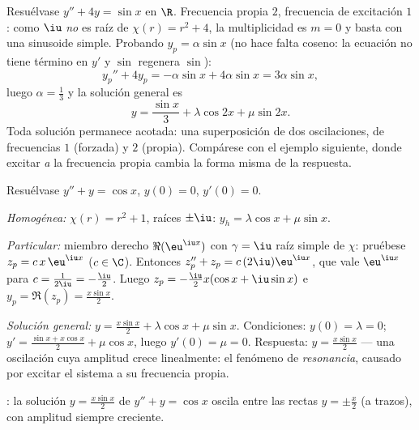 \begin{example}\label{ex:b1:diffeq:offresonance}
Resuélvase $y'' + 4y = \sin x$ en $\R$. Frecuencia propia $2$,
frecuencia de excitación $1$: como $\iu$ \emph{no} es raíz de
$\chi(r) = r^2 + 4$, la multiplicidad es $m = 0$ y basta con una
sinusoide simple. Probando $y_p = \alpha\sin x$ (no hace falta coseno:
la ecuación no tiene término en $y'$ y $\sin$ regenera $\sin$):
\[
y_p'' + 4y_p = -\alpha\sin x + 4\alpha\sin x = 3\alpha\sin x ,
\]
luego $\alpha = \frac13$ y la solución general es
\[
y = \frac{\sin x}3 + \lambda\cos 2x + \mu\sin 2x .
\]
Toda solución permanece acotada: una superposición de dos oscilaciones,
de frecuencias $1$ (forzada) y $2$ (propia). Compárese con el ejemplo
siguiente, donde excitar \emph{a} la frecuencia propia cambia la forma
misma de la respuesta.
\end{example}

\begin{example}\label{ex:b1:diffeq:oscillation}
Resuélvase $y'' + y = \cos x$, $y(0) = 0$, $y'(0) = 0$.

\emph{Homogénea:} $\chi(r) = r^2 + 1$, raíces $\pm\iu$:
$y_h = \lambda\cos x + \mu \sin x$.

\emph{Particular:} miembro derecho $\Re(\eu^{\iu x})$ con
$\gamma = \iu$ raíz simple de $\chi$: pruébese $z_p = c\, x\,
\eu^{\iu x}$ ($c \in \C$). Entonces $z_p'' + z_p = c\,(2\iu)\eu^{\iu x}$,
que vale $\eu^{\iu x}$ para $c = \frac{1}{2\iu} = -\frac\iu2$. Luego
$z_p = -\frac{\iu}{2} x (\cos x + \iu \sin x)$ e
$y_p = \Re(z_p) = \frac{x \sin x}{2}$.

\emph{Solución general:} $y = \frac{x\sin x}{2} + \lambda\cos x +
\mu\sin x$. Condiciones: $y(0) = \lambda = 0$; $y' = \frac{\sin x +
x\cos x}{2} + \mu\cos x$, luego $y'(0) = \mu = 0$. Respuesta:
$y = \frac{x\sin x}{2}$ --- una oscilación cuya amplitud crece
linealmente: el fenómeno de \emph{resonancia},
causado por excitar el sistema a su frecuencia propia.
\end{example}

\begin{omfigure}

{\small {}: la solución $y = \frac{x \sin x}{2}$ de
$y'' + y = \cos x$ oscila entre las rectas $y = \pm\frac x2$ (a
trazos), con amplitud siempre creciente.}
\end{omfigure}

